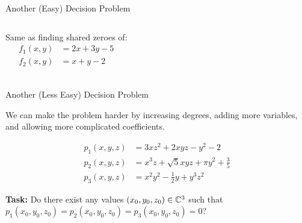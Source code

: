 \documentclass[c]{beamer}
\begin{document}
\begin{frame}{Another (Easy) Decision Problem}
  
  \begin{columns}
    
    Same as finding shared zeroes of:
    \begin{align*}
      f_1(x,y) &= 2x + 3y - 5\\
      f_2(x,y) &= x + y - 2\\
    \end{align*}


    \begin{center}
    \end{center}
  \end{columns}
\end{frame}

\begin{frame}{Another (Less Easy) Decision Problem}
 
  We can make the problem harder by increasing degrees, adding more
  variables, and allowing more complicated coefficients.
  
  \vspace{-\baselineskip}

  \begin{align*}
    p_1(x, y, z) &= 3xz^2 + 2xyz - y^2 - 2\\
    p_2(x, y, z) &= x^3z + \sqrt{5}xyz + \pi y^2 + \frac{3}{5}\\
    p_3(x, y, z) &= x^2y^2 - \frac{1}{2}y + y^3z^2
  \end{align*}\pause
  
  \textbf{Task:} Do there exist any values $(x_0, y_0, z_0) \in
  \mathbb{C}^3$ such that $p_1(x_0, y_0, z_0) = p_2(x_0, y_0, z_0) =
  p_3(x_0, y_0, z_0) = 0$?
  
\end{frame}
\end{document}
